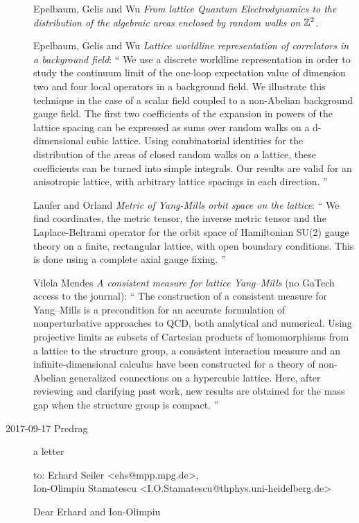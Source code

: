 \begin{description}
Epelbaum, Gelis and Wu
{\em From lattice Quantum Electrodynamics to the distribution of
    the algebraic areas enclosed by random walks on $\mathbb{Z}^2$}.


Epelbaum, Gelis and Wu
{\em Lattice worldline representation of correlators in a background field}: ``
We use a discrete worldline representation in order to study the continuum
limit of the one-loop expectation value of dimension two and four local
operators in a background field. We illustrate this technique in the case of
a scalar field coupled to a non-Abelian background gauge field. The first two
coefficients of the expansion in powers of the lattice spacing can be
expressed as sums over random walks on a d-dimensional cubic lattice. Using
combinatorial identities for the distribution of the areas of closed random
walks on a lattice, these coefficients can be turned into simple integrals.
Our results are valid for an anisotropic lattice, with arbitrary lattice
spacings in each direction.
''

Laufer and Orland
{\em Metric of {Yang-Mills} orbit space on the lattice}: ``
We find coordinates, the metric tensor, the inverse metric tensor and the
Laplace-Beltrami operator for the orbit space of Hamiltonian SU(2) gauge
theory on a finite, rectangular lattice, with open boundary conditions. This
is done using a complete axial gauge fixing.
''

Vilela Mendes {\em A consistent measure for lattice Yang–Mills}
(no GaTech access to the journal): ``
The construction of a consistent measure for Yang–Mills is a precondition for
an accurate formulation of nonperturbative approaches to QCD, both analytical
and numerical. Using projective limits as subsets of Cartesian products of
homomorphisms from a lattice to the structure group, a consistent interaction
measure and an infinite-dimensional calculus have been constructed for a
theory of non-Abelian generalized connections on a hypercubic lattice. Here,
after reviewing and clarifying past work, new results are obtained for the
mass gap when the structure group is compact.
''

\item[2017-09-17 Predrag]
a letter

to: Erhard Seiler <ehs@mpp.mpg.de>,\\
    Ion-Olimpiu Stamatescu <I.O.Stamatescu@thphys.uni-heidelberg.de>

\bigskip

Dear Erhard and Ion-Olimpiu


\end{description}
